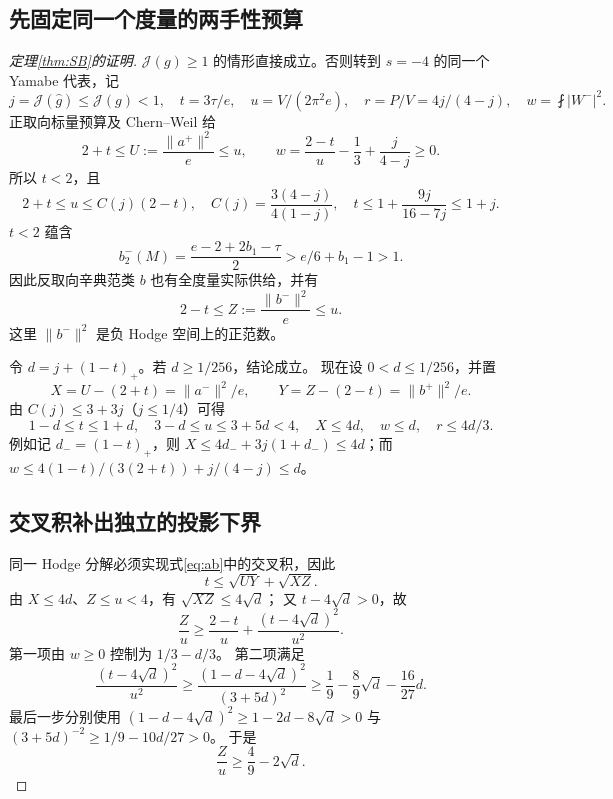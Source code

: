 \documentclass[UTF8,11pt,a4paper,fontset=none]{ctexart}
\numberwithin{equation}{section}
\theoremstyle{definition}
\theoremstyle{remark}\newtheorem{remark}[theorem]{说明}
\newcommand{\Jcal}{\mathcal J}
\newcommand{\avint}{\fint}
\begin{document}
\subsection{先固定同一个度量的两手性预算}
\begin{proof}[定理\ref{thm:SB}的证明]
$\Jcal(g)\ge1$ 的情形直接成立。否则转到 $s=-4$ 的同一个 Yamabe 代表，记
\[
j=\Jcal(\widehat g)\le\Jcal(g)<1,\quad
 t=3\tau/e,\quad u=V/(2\pi^2e),\quad
 r=P/V=4j/(4-j),\quad w=\avint|W^-|^2.
\]
正取向标量预算及 Chern--Weil 给
\begin{equation}\label{eq:SB-budgets}
2+t\le U:=\frac{\|a^+\|^2}{e}\le u,
\qquad
w=\frac{2-t}{u}-\frac13+\frac{j}{4-j}\ge0.
\end{equation}
所以 $t<2$，且
\begin{equation}\label{eq:SB-Cj}
2+t\le u\le C(j)(2-t),\quad
C(j)=\frac{3(4-j)}{4(1-j)},\quad
 t\le1+\frac{9j}{16-7j}\le1+j.
\end{equation}
$t<2$ 蕴含
\[
b_2^-(M)=\frac{e-2+2b_1-\tau}{2}>e/6+b_1-1>1.
\]
因此反取向辛典范类 $b$ 也有全度量实际供给，并有
\[
2-t\le Z:=\frac{\|b^-\|^2}{e}\le u.
\]
这里 $\|b^-\|^2$ 是负 Hodge 空间上的正范数。

令 $d=j+(1-t)_+$。若 $d\ge1/256$，结论成立。
现在设 $0<d\le1/256$，并置
\[
X=U-(2+t)=\|a^-\|^2/e,\qquad
Y=Z-(2-t)=\|b^+\|^2/e.
\]
由 $C(j)\le3+3j$（$j\le1/4$）可得
\begin{equation}\label{eq:SB-small}
1-d\le t\le1+d,\quad 3-d\le u\le3+5d<4,
\quad X\le4d,\quad w\le d,\quad r\le4d/3.
\end{equation}
例如记 $d_-=(1-t)_+$，则
$X\le4d_-+3j(1+d_-)\le4d$；而
$w\le4(1-t)/(3(2+t))+j/(4-j)\le d$。

\subsection*{交叉积补出独立的投影下界}
同一 Hodge 分解必须实现式\eqref{eq:ab}中的交叉积，因此
\begin{equation}\label{eq:cross}
\boxed{t\le\sqrt{UY}+\sqrt{XZ}.}
\end{equation}
由 $X\le4d$、$Z\le u<4$，有 $\sqrt{XZ}\le4\sqrt d$；
又 $t-4\sqrt d>0$，故
\[
\frac Zu\ge\frac{2-t}{u}+\frac{(t-4\sqrt d)^2}{u^2}.
\]
第一项由 $w\ge0$ 控制为 $1/3-d/3$。
第二项满足
\[
\frac{(t-4\sqrt d)^2}{u^2}
\ge\frac{(1-d-4\sqrt d)^2}{(3+5d)^2}
\ge\frac19-\frac89\sqrt d-\frac{16}{27}d.
\]
最后一步分别使用
$(1-d-4\sqrt d)^2\ge1-2d-8\sqrt d>0$ 与
$(3+5d)^{-2}\ge1/9-10d/27>0$。
于是
\begin{equation}\label{eq:Z-lower}
\boxed{\frac Zu\ge\frac49-2\sqrt d.}
\end{equation}


\end{proof}
\end{document}
